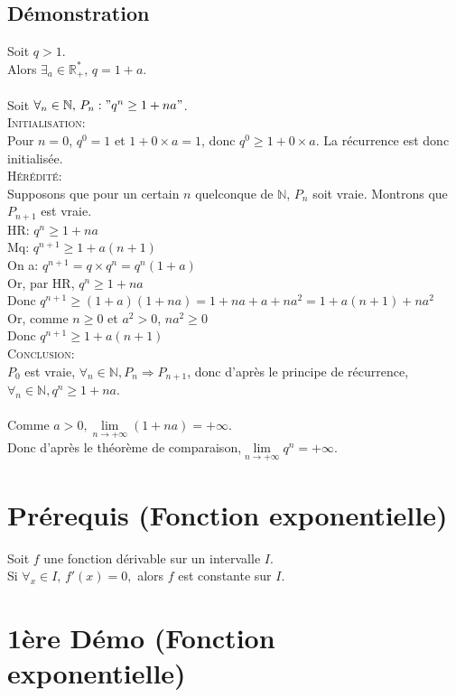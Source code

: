 \documentclass[12px]{article}
\begin{document}
	\subsection{Démonstration}
	Soit $q>1$.\\
	Alors $\exists_a\in\mathbb{R}_+^*, \,q=1+a$.\\
	\\
	Soit $\forall_n\in\mathbb{N}, \,P_n:"q^n\geq 1+na"$.\\
	\textsc{Initialisation:}\\
	Pour $n=0$, $q^0=1$ et $1+0\times a=1$, donc $q^0\geq 1+0\times a$. La récurrence est donc initialisée.\\
	\textsc{Hérédité:}\\
	Supposons que pour un certain $n$ quelconque de $\mathbb{N}$, $P_n$ soit vraie. Montrons que $P_{n+1}$ est vraie.\\
	HR: $q^n \geq 1+na$\\
	Mq: $q^{n+1} \geq 1+a(n+1)$\\
	On a: $q^{n+1}=q\times q^n =q^n(1+a)$\\
	Or, par HR, $q^n \geq 1+na$\\
	Donc $q^{n+1} \geq (1+a)(1+na) = 1+na+a+na^2 = 1+a(n+1)+na^2$\\
	Or, comme $n\geq 0$ et $a^2>0$, $na^2\geq 0$\\
	Donc $q^{n+1}\geq 1+a(n+1)$\\
	\textsc{Conclusion:}\\
	$P_0$ est vraie, $\forall_n\in\mathbb{N},P_n\Rightarrow P_{n+1}$, donc d'après le principe de récurrence, $\forall_n\in\mathbb{N}, q^n\geq 1+na$.\\
	\\
	Comme $a>0, \lim\limits_{n\rightarrow +\infty}(1+na)= +\infty$.\\
	Donc d'après le théorème de comparaison,$ \lim\limits_{n\rightarrow +\infty}q^n=+\infty$.
	
	\section{Prérequis (Fonction exponentielle)}
	Soit $f$ une fonction dérivable sur un intervalle $I$.\\
	Si $\forall_x\in I, \,f'(x)=0,$ alors $f$ est constante sur $I$.\\
	
	\section{1ère Démo (Fonction exponentielle)}
		
\end{document}
